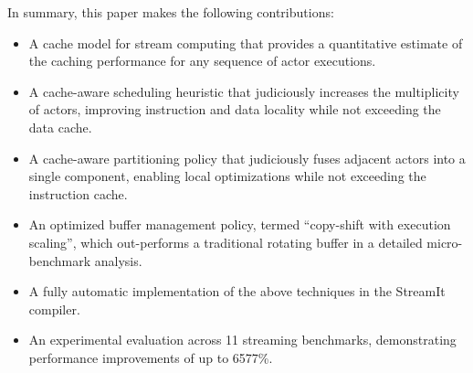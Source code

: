 In summary, this paper makes the following contributions:
\begin{itemize}

\item A cache model for stream computing that provides a quantitative
estimate of the caching performance for any sequence of actor
executions.

\item A cache-aware scheduling heuristic that judiciously increases
the multiplicity of actors, improving instruction and data locality
while not exceeding the data cache.

\item A cache-aware partitioning policy that judiciously fuses
adjacent actors into a single component, enabling local optimizations
while not exceeding the instruction cache.

\item An optimized buffer management policy, termed ``copy-shift with
execution scaling'', which out-performs a traditional rotating buffer
in a detailed micro-benchmark analysis.

\item A fully automatic implementation of the above techniques in the
StreamIt compiler.

\item An experimental evaluation across 11 streaming benchmarks,
demonstrating performance improvements of up to 6577\%.
\end{itemize}






